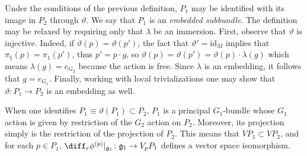 
Under the conditions of the previous definition, \(P_1\) may be identified with its image in \(P_2\) through \(\vartheta\). We say that \(P_1\) is an \textit{embedded subbundle}. The definition may be relaxed by requiring only that \(\lambda\) be an immersion. First, observe that \(\vartheta\) is injective. Indeed, if \(\vartheta(p)=\vartheta (p')\), the fact that \(\vartheta'=\mathrm{id}_M\) implies that \(\pi_1(p)=\pi_1(p')\), thus \(p'=p\cdot g\), so \(\vartheta(p)=\vartheta(p')=\vartheta(p)\cdot \lambda(g)\) which means \(\lambda(g)=e_{G_2}\) because the action is free. Since \(\lambda\) is an embedding, it follows that \(g=e_{G_1}\). Finally, working with local trivializations one may show that \(\vartheta\colon P_1 \to P_2\) is an embedding as well.

When one identifies \(P_1 \equiv \vartheta(P_1) \subset P_2\), \(P_1\) is a principal \(G_1\)-bundle whose \(G_1\) action is given by restriction of the \(G_2\) action on \(P_2\). Moreover, its projection simply is the restriction of the projection of \(P_2\). This means that \(VP_1 \subset VP_2\), and for each \(p \in P_1\), \(\diff_e\phi^{(p)}|_{\mathfrak{g}_1}\colon \mathfrak{g}_1 \to V_pP_1\) defines a vector space isomorphism.

